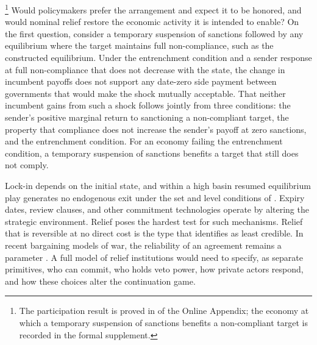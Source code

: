 \footnote{The participation
result is proved in  of the Online Appendix; the economy
at which a temporary suspension of sanctions benefits a non-compliant target is recorded in the
formal supplement.}
Would policymakers prefer the arrangement and expect it to be honored, and would nominal
relief restore the economic activity it is intended to enable? On the first question,
consider a temporary suspension of sanctions followed by any equilibrium where the target
maintains full non-compliance, such as the constructed equilibrium. Under the
entrenchment condition and a sender response at full non-compliance that does not
decrease with the state, the change in incumbent payoffs does not support any date-zero
side payment between governments that would make the shock mutually acceptable. That
neither incumbent gains from such a shock follows jointly from three conditions: the
sender's positive marginal return to sanctioning a non-compliant target, the property
that compliance does not increase the sender's payoff at zero sanctions, and the
entrenchment condition. For an economy failing the entrenchment condition, a temporary
suspension of sanctions benefits a target that still does not comply.

 Lock-in depends on the initial state, and within a high basin resumed
equilibrium play generates no endogenous exit under the set and level conditions of
. Expiry dates, review clauses, and other commitment technologies
operate by altering the strategic environment. Relief poses the hardest test for such
mechanisms. Relief that is reversible at no direct cost is the type that
\citet[p.~627]{Powell2012} identifies as least credible. In recent bargaining models of
war, the reliability of an agreement remains a parameter \citep{Ruggiero2026}. A full
model of relief institutions would need to specify, as separate primitives, who can
commit, who holds veto power, how private actors respond, and how these choices alter the
continuation game.

